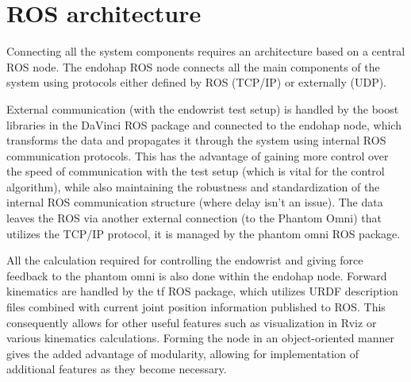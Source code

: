 \section{ROS architecture}\label{ros_architec}

Connecting all the system components requires an architecture based on a central ROS node.
The endohap ROS node connects all the main components of the system using protocols either defined by ROS (TCP/IP) or externally (UDP).

External communication (with the endowrist test setup) is handled by the boost libraries in the DaVinci ROS package and connected to the endohap node, which transforms the data and propagates it through the system using internal ROS communication protocols. 
This has the advantage of gaining more control over the speed of communication with the test setup (which is vital for the control algorithm), while also maintaining the robustness and standardization of the internal ROS communication structure (where delay isn't an issue). The data leaves the ROS via another external connection (to the Phantom Omni) that utilizes the TCP/IP protocol, it is managed by the phantom omni ROS package.

All the calculation required for controlling the endowrist and giving force feedback to the phantom omni is also done within the endohap node. Forward kinematics are handled by the tf ROS package, which utilizes URDF description files combined with current joint position information published to ROS.
This consequently allows for other useful features such as visualization in Rviz or various kinematics calculations.
Forming the node in an object-oriented manner gives the added advantage of modularity, allowing for implementation of additional features as they become necessary. 





